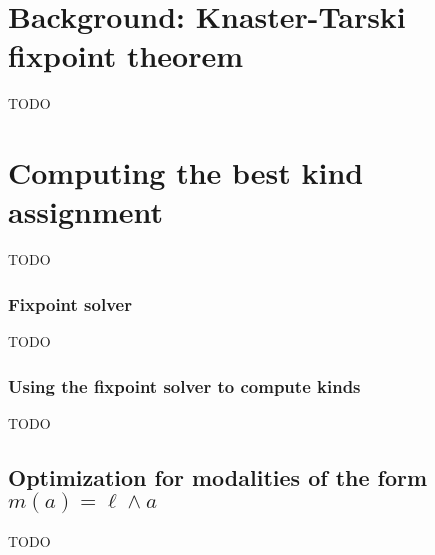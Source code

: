 \documentclass{article}
\begin{document}
\section{Background: Knaster-Tarski fixpoint theorem}

TODO

\section{Computing the best kind assignment}

TODO

\subsubsection{Fixpoint solver}

TODO

\subsubsection{Using the fixpoint solver to compute kinds}

TODO


\subsection{Optimization for modalities of the form $m(a) = \ell \wedge a$}

TODO
\end{document}
